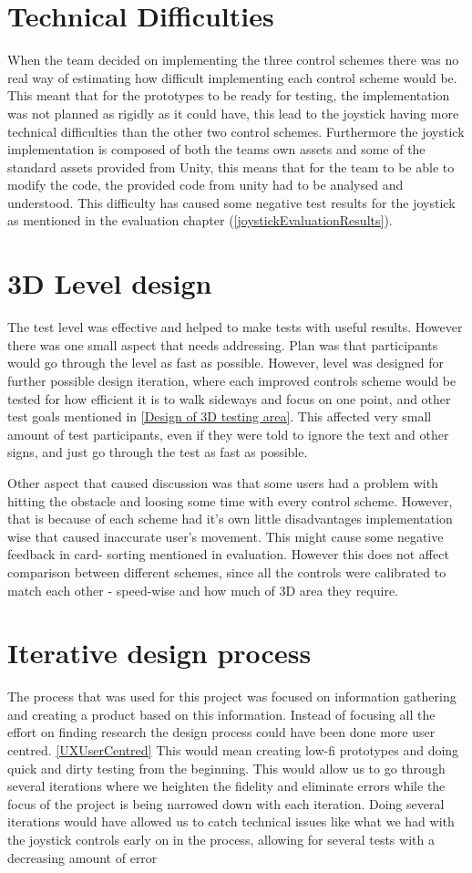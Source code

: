 \section*{Technical Difficulties}
When the team decided on implementing the three control schemes there was no real way of estimating how difficult implementing each control scheme would be. This meant that for the prototypes to be ready for testing, the implementation was not planned as rigidly as it could have, this lead to the joystick having more technical difficulties than the other two control schemes. Furthermore the joystick implementation is composed of both the teams own assets and some of the standard assets provided from Unity, this means that for the team to be able to modify the code, the provided code from unity had to be analysed and understood. This difficulty has caused some negative test results for the joystick as mentioned in the evaluation chapter (\ref{joystickEvaluationResults}). 

\section*{3D Level design}
The test level was effective and helped to make tests with useful results. However there was one small aspect that needs addressing. Plan was that participants would go through the level as fast as possible. However, level was designed for further possible design iteration, where each improved controls scheme would be tested for how efficient it is to walk sideways and focus on one point, and other test goals mentioned in \ref {Design of 3D testing area}. This affected very small amount of test participants, even if they were told to ignore the text and other signs, and just go through the test as fast as possible. 

Other aspect that caused discussion was that some users had a problem with hitting the obstacle and loosing some time with every control scheme. However, that is because of each scheme had it’s own little disadvantages implementation wise that caused inaccurate user’s movement. 
This might cause some negative feedback in card- sorting mentioned in evaluation. However this does not affect comparison between different schemes, since all the controls were calibrated to match each other - speed-wise and how much of 3D area they require. 

\section*{Iterative design process}
The process that was used for this project was focused on information gathering and creating a product based on this information.
Instead of focusing all the effort on finding research the design process could have been done more user centred. \ref{UXUserCentred}
This would mean creating low-fi prototypes and doing quick and dirty testing from the beginning. This would allow us to go through several iterations where we heighten the fidelity and eliminate errors while the focus of the project is being narrowed down with each iteration. Doing several iterations would have allowed us to catch technical issues like what we had with the joystick controls early on in the process, allowing for several tests with a decreasing amount of error
